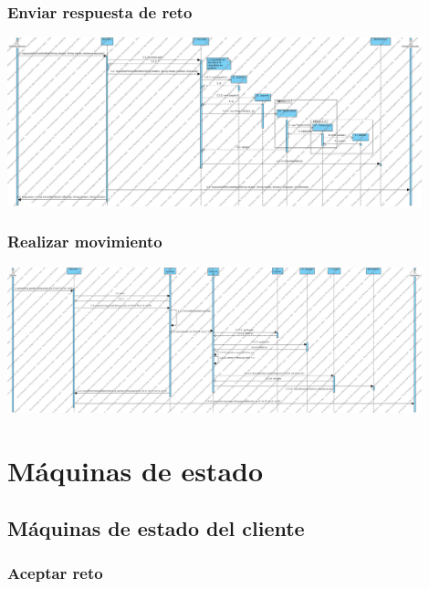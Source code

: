 \documentclass[a4paper,11pt,oneside]{article}
\begin{document}
\subsubsection{Enviar respuesta de reto}

\includegraphics[width=0.9\textwidth]{img/ds_EnviarRespuestaRetoServidor.png}\\[1cm]

\subsubsection{Realizar movimiento}

\includegraphics[width=0.9\textwidth]{img/ds_RealizarMovimientoServidor.png}\\[1cm]



\section{Máquinas de estado}

\subsection{Máquinas de estado del cliente}

\subsubsection{Aceptar reto}
\end{document}
